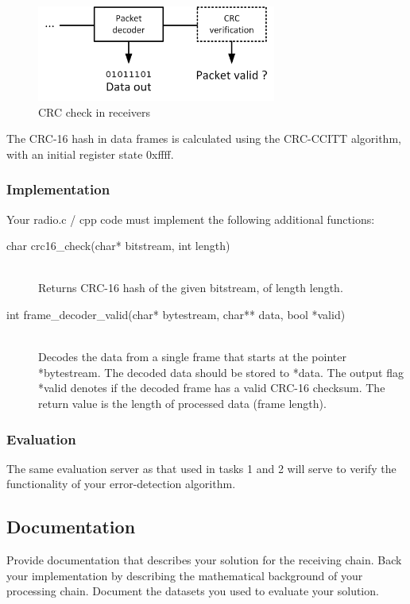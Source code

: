 \documentclass{article}
\begin{document}
\begin{figure}[h!]
\centering
\includegraphics[width=0.7\textwidth]{Images/Task3.png}
\caption{CRC check in receivers}
\label{fig:task3}
\end{figure}

The CRC-16 hash in data frames is calculated using the CRC-CCITT algorithm, with an initial register state \textsf{0xffff}.

\subsubsection{Implementation}
Your \textsf{radio.c / cpp} code must implement the following additional functions:
\begin{description}
	\item[char crc16\_check(char* bitstream, int length)]
	\,\\ Returns CRC-16 hash of the given \textsf{bitstream}, of length \textsf{length}.
	\item[int frame\_decoder\_valid(char* bytestream, char** data, bool *valid)]
	\,\\ Decodes the data from a single frame that starts at the pointer \textsf{*bytestream}. The decoded data should be stored to \textsf{*data}. The output flag \textsf{*valid} denotes if the decoded frame has a valid CRC-16 checksum. The return value is the length of processed data (frame length).
\end{description}

\subsubsection{Evaluation}

The same evaluation server as that used in tasks 1 and 2 will serve to verify the functionality of your error-detection algorithm.

\subsection{Documentation}

Provide documentation that describes your solution for the receiving chain. Back your implementation by describing the mathematical background of your processing chain. Document the datasets you used to evaluate your solution.
\end{document}
